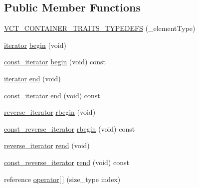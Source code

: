\subsection*{Public Member Functions}
\begin{DoxyCompactItemize}
\item 
\hyperlink{classvct_fixed_size_vector_base_ab3b054b9aab3d18bede3625dc21e7e03}{V\-C\-T\-\_\-\-C\-O\-N\-T\-A\-I\-N\-E\-R\-\_\-\-T\-R\-A\-I\-T\-S\-\_\-\-T\-Y\-P\-E\-D\-E\-F\-S} (\-\_\-element\-Type)
\item 
\hyperlink{classvct_fixed_size_const_vector_base_ad0ba9b13bb2515695b4e44290bdbaa5d}{iterator} \hyperlink{classvct_fixed_size_vector_base_a33701a89bb47502755bddcae4f90a3f9}{begin} (void)
\item 
\hyperlink{classvct_fixed_size_const_vector_base_abc547e0542bb6f7d92876a56c7ea5cdc}{const\-\_\-iterator} \hyperlink{classvct_fixed_size_vector_base_a19fa87360c79625bcf41d47e81a4ac22}{begin} (void) const 
\item 
\hyperlink{classvct_fixed_size_const_vector_base_ad0ba9b13bb2515695b4e44290bdbaa5d}{iterator} \hyperlink{classvct_fixed_size_vector_base_aeca0ac3cfb6e9ba38c26156a10ac29a6}{end} (void)
\item 
\hyperlink{classvct_fixed_size_const_vector_base_abc547e0542bb6f7d92876a56c7ea5cdc}{const\-\_\-iterator} \hyperlink{classvct_fixed_size_vector_base_a53ee162a91db4000127322aea2ae017b}{end} (void) const 
\item 
\hyperlink{classvct_fixed_size_const_vector_base_ae22e8ced509e202d00620f384ac3a5b2}{reverse\-\_\-iterator} \hyperlink{classvct_fixed_size_vector_base_a82f6ae2d7b99a575ecc37d85546e02b4}{rbegin} (void)
\item 
\hyperlink{classvct_fixed_size_const_vector_base_acd0a5fe64ff3551c45cebfb2ba81cf10}{const\-\_\-reverse\-\_\-iterator} \hyperlink{classvct_fixed_size_vector_base_a818b388afd102d44b0f891a4569412fc}{rbegin} (void) const 
\item 
\hyperlink{classvct_fixed_size_const_vector_base_ae22e8ced509e202d00620f384ac3a5b2}{reverse\-\_\-iterator} \hyperlink{classvct_fixed_size_vector_base_a8139ac1cfaa84e3339a7d03389f99b1a}{rend} (void)
\item 
\hyperlink{classvct_fixed_size_const_vector_base_acd0a5fe64ff3551c45cebfb2ba81cf10}{const\-\_\-reverse\-\_\-iterator} \hyperlink{classvct_fixed_size_vector_base_a137196da03a3ea70202da0db8e02afa9}{rend} (void) const 
\item 
reference \hyperlink{classvct_fixed_size_vector_base_afac291ac9bf689086e7095daada45dee}{operator\mbox{[}$\,$\mbox{]}} (size\-\_\-type index)

\end{DoxyCompactItemize}
